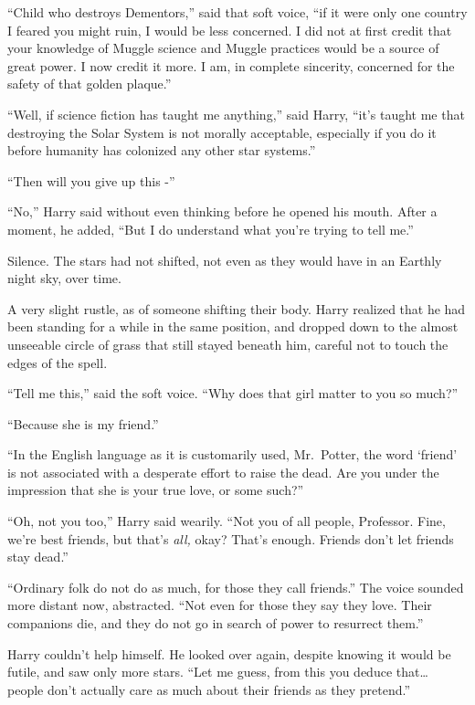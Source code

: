 ``Child who destroys Dementors,'' said that soft voice, ``if it were
only one country I feared you might ruin, I would be less concerned. I
did not at first credit that your knowledge of Muggle science and Muggle
practices would be a source of great power. I now credit it more. I am,
in complete sincerity, concerned for the safety of that golden plaque.''

``Well, if science fiction has taught me anything,'' said Harry, ``it's
taught me that destroying the Solar System is not morally acceptable,
especially if you do it before humanity has colonized any other star
systems.''

``Then will you give up this -''

``No,'' Harry said without even thinking before he opened his mouth.
After a moment, he added, ``But I do understand what you're trying to
tell me.''

Silence. The stars had not shifted, not even as they would have in an
Earthly night sky, over time.

A very slight rustle, as of someone shifting their body. Harry realized
that he had been standing for a while in the same position, and dropped
down to the almost unseeable circle of grass that still stayed beneath
him, careful not to touch the edges of the spell.

``Tell me this,'' said the soft voice. ``Why does that girl matter to
you so much?''

``Because she is my friend.''

``In the English language as it is customarily used, Mr.~Potter, the
word `friend' is not associated with a desperate effort to raise the
dead. Are you under the impression that she is your true love, or some
such?''

``Oh, not you too,'' Harry said wearily. ``Not you of all people,
Professor. Fine, we're best friends, but that's \emph{all,} okay? That's
enough. Friends don't let friends stay dead.''

``Ordinary folk do not do as much, for those they call friends.'' The
voice sounded more distant now, abstracted. ``Not even for those they
say they love. Their companions die, and they do not go in search of
power to resurrect them.''

Harry couldn't help himself. He looked over again, despite knowing it
would be futile, and saw only more stars. ``Let me guess, from this you
deduce that\ldots{} people don't actually care as much about their
friends as they pretend.''

